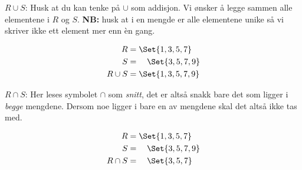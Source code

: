 \documentclass[a4paper,11pt]{article}
\def\firstcircle{(0,0) circle(1cm)}
\def\secondcircle{(0:1cm) circle (1cm)}
\begin{document}
\begin{solution}
    \def\firstcircle{(0,0) circle(1cm)}
    \def\secondcircle{(0:1cm) circle (1cm)}
  \textcolor{UiT-main}{$R \cup S$}: Husk at du kan tenke på $\cup$ som addisjon.
  Vi ønsker å legge sammen alle elementene i $R$ og $S$. \textbf{NB:} husk at i
  en mengde er alle elementene unike så vi skriver ikke ett element mer enn èn
  gang.

  \begin{minipage}{0.5\textwidth}
    \centering
    \begin{align*}
      R & = \Set{1, 3, 5, 7} \\
      S & = \quad \Set{3, 5, 7, 9} \\
      R \cup S & = \Set{1, 3, 5, 7, 9}
    \end{align*}
  \end{minipage}
  \begin{minipage}{0.5\textwidth}
    \centering
  \end{minipage} \medskip

  \textcolor{UiT-main}{$R \cap S$}: Her leses symbolet $\cap$ som \emph{snitt},
  det er altså snakk bare det som ligger i \emph{begge} mengdene. Dersom noe
  ligger i bare en av mengdene skal det altså ikke tas med.

  \begin{minipage}{0.5\textwidth}
    \centering
    \begin{align*}
      R & = \Set{1, 3, 5, 7} \\
      S & = \quad \Set{3, 5, 7, 9} \\
      R \cap S & = \quad \Set{3, 5, 7}
    \end{align*}
  \end{minipage}
  \begin{minipage}{0.5\textwidth}
    \centering
  \end{minipage} \medskip


\end{solution}
\end{document}
